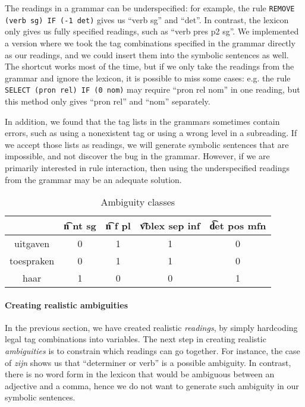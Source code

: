 {{The readings in a grammar can be underspecified: for example, the rule
\texttt{REMOVE (verb sg) IF (-1 det)} gives us ``verb sg'' and ``det''.
In contrast, the lexicon only gives us fully specified readings, such
as ``verb pres p2 sg''. We implemented a version where we took
the tag combinations specified in the grammar directly as our
readings, and we could insert them into the symbolic sentences as well.
The shortcut works most of the time, but if we only take the readings
from the grammar and ignore the lexicon, it is possible to
miss some cases: e.g. the rule \texttt{SELECT (pron rel) IF (0 nom)}
may require ``pron rel nom'' in one reading, but this method only gives
``pron rel'' and ``nom'' separately.


In addition, we found that the tag lists in the grammars sometimes
contain errors, such as using a nonexistent tag or using a wrong level
in a subreading. If we accept those lists as readings, we will
generate symbolic sentences that are impossible, and not discover
the bug in the grammar.
However, if we are primarily interested in rule interaction, then using
the underspecified readings from the grammar may be an adequate solution.



\begin{table}[h]
\centering
\begin{tabular}{ c|c|c|c|c}
             & \t{n nt sg}  & \t{n f pl}  & \t{vblex sep inf} & \t{det pos mfn}  \\ \hline
 uitgaven    & 0        & 1       & 1             & 0    \\
 toespraken  & 0        & 1       & 1             & 0    \\
 haar        & 1        & 0       & 0             & 1    \\
\end{tabular}
\caption{Ambiguity classes}
\label{table:ambclass}
\end{table}

\paragraph{Creating realistic ambiguities}


In the previous section, we have created realistic \emph{readings}, by simply hardcoding legal tag combinations into variables. The next step in creating realistic \emph{ambiguities} is to constrain which readings can go together. For instance, the case of \emph{zijn} shows us that ``determiner or verb'' is a possible ambiguity. In contrast, there is no word form in the lexicon that would be ambiguous between an adjective and a comma, hence we do not want to generate such ambiguity in our symbolic sentences.


}}
